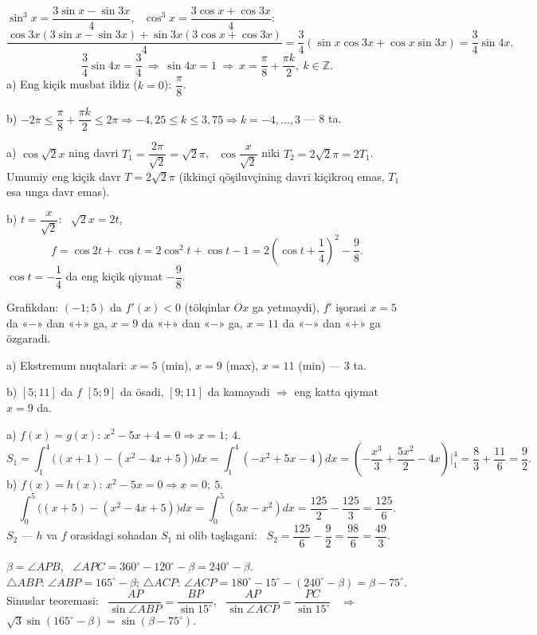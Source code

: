 \newpage
{}
$\sin^3x=\dfrac{3\sin x-\sin3x}4$, \ $\cos^3x=\dfrac{3\cos x+\cos3x}4$:
\[\frac{\cos3x(3\sin x-\sin3x)+\sin3x(3\cos x+\cos3x)}4=\frac34\left(\sin x\cos3x+\cos x\sin3x\right)=\frac34\sin4x.\]
\[\frac34\sin4x=\frac34\ \Rightarrow\ \sin4x=1\ \Rightarrow\ x=\frac\pi8+\frac{\pi k}2,\ k\in\mathbb Z.\]
a) Eng kiçik musbat ildiz ($k=0$): $\dfrac\pi8$.

b) $-2\pi\le\dfrac\pi8+\dfrac{\pi k}2\le2\pi\Rightarrow -4{,}25\le k\le3{,}75\Rightarrow k=-4,\dots,3$ — 8 ta.

\newpage
{}
a) $\cos\sqrt2x$ ning davri $T_1=\dfrac{2\pi}{\sqrt2}=\sqrt2\pi$, \ $\cos\dfrac x{\sqrt2}$ niki $T_2=2\sqrt2\pi=2T_1$.\\
Umumiy eng kiçik davr $T=2\sqrt2\pi$ (ikkinçi qöşiluvçining davri kiçikroq emas, $T_1$ esa unga davr emas).

b) $t=\dfrac x{\sqrt2}$: \ $\sqrt2x=2t$,
\[f=\cos2t+\cos t=2\cos^2t+\cos t-1=2\left(\cos t+\frac14\right)^2-\frac98.\]
$\cos t=-\dfrac14$ da eng kiçik qiymat $-\dfrac98$.

\newpage
{}
Grafikdan: $(-1;5)$ da $f'(x)<0$ (tölqinlar $Ox$ ga yetmaydi), $f'$ işorasi $x=5$ da «$-$» dan «$+$» ga, $x=9$ da «$+$» dan «$-$» ga, $x=11$ da «$-$» dan «$+$» ga özgaradi.

a) Ekstremum nuqtalari: $x=5$ (min), $x=9$ (max), $x=11$ (min) — 3 ta.

b) $[5;11]$ da $f$ $[5;9]$ da ösadi, $[9;11]$ da kamayadi $\Rightarrow$ eng katta qiymat $x=9$ da.

\newpage
{}
a) $f(x)=g(x)$: $x^2-5x+4=0\Rightarrow x=1;\ 4$.
\[S_1=\int_1^4\bigl((x+1)-(x^2-4x+5)\bigr)dx=\int_1^4(-x^2+5x-4)dx=\left(-\frac{x^3}3+\frac{5x^2}2-4x\right)\Big|_1^4=\frac83+\frac{11}6=\frac92.\]
b) $f(x)=h(x)$: $x^2-5x=0\Rightarrow x=0;\ 5$.
\[\int_0^5\bigl((x+5)-(x^2-4x+5)\bigr)dx=\int_0^5(5x-x^2)dx=\frac{125}2-\frac{125}3=\frac{125}6.\]
$S_2$ — $h$ va $f$ orasidagi sohadan $S_1$ ni olib taşlagani: \ $S_2=\dfrac{125}6-\dfrac92=\dfrac{98}6=\dfrac{49}3$.

\newpage
{}
$\beta=\angle APB$, \ $\angle APC=360^\circ-120^\circ-\beta=240^\circ-\beta$.\\
$\triangle ABP$: $\angle ABP=165^\circ-\beta$; \quad $\triangle ACP$: $\angle ACP=180^\circ-15^\circ-(240^\circ-\beta)=\beta-75^\circ$.\\
Sinuslar teoremasi: \ $\dfrac{AP}{\sin\angle ABP}=\dfrac{BP}{\sin15^\circ}$, \ $\dfrac{AP}{\sin\angle ACP}=\dfrac{PC}{\sin15^\circ}$ \ $\Rightarrow$ \ $\sqrt3\sin(165^\circ-\beta)=\sin(\beta-75^\circ)$.

